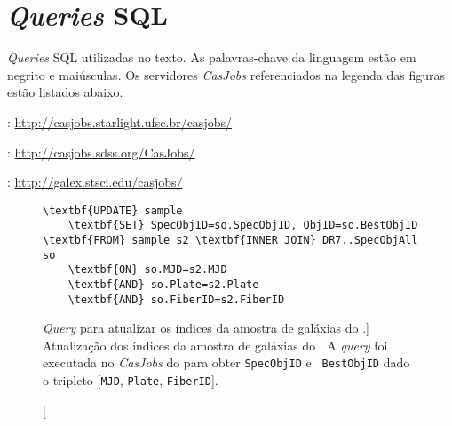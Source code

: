 



\chapter{{\em Queries} SQL}
\label{apendice:Queries}

{\em Queries} SQL utilizadas no texto. As palavras-chave da linguagem
estão em negrito e maiúsculas. Os servidores {\em CasJobs} referenciados na
legenda das figuras estão listados abaixo.

\begin{list}{}{\setlength\itemsep{0pt}}
\item \starlight: \url{http://casjobs.starlight.ufsc.br/casjobs/}
\item \SDSS: \url{http://casjobs.sdss.org/CasJobs/}
\item \galex: \url{http://galex.stsci.edu/casjobs/}
\end{list}



\begin{figure}
\begin{Verbatim}[frame=single,commandchars=\\\{\}]
\textbf{UPDATE} sample
	\textbf{SET} SpecObjID=so.SpecObjID, ObjID=so.BestObjID
\textbf{FROM} sample s2 \textbf{INNER JOIN} DR7..SpecObjAll so
	\textbf{ON} so.MJD=s2.MJD
	\textbf{AND} so.Plate=s2.Plate
	\textbf{AND} so.FiberID=s2.FiberID
\end{Verbatim}
	\caption
	[{\em Query} para atualizar os índices da amostra de galáxias do
	\starlight.]
	{Atualização dos índices da amostra de galáxias do \starlight. A {\em query}
	foi executada no {\em CasJobs} do \SDSS para obter {\tt SpecObjID} e {\tt
	BestObjID} dado o tripleto [{\tt MJD}, {\tt Plate}, {\tt FiberID}].}
	\label{fig:QueryAtualizaObjIds}
\end{figure}


